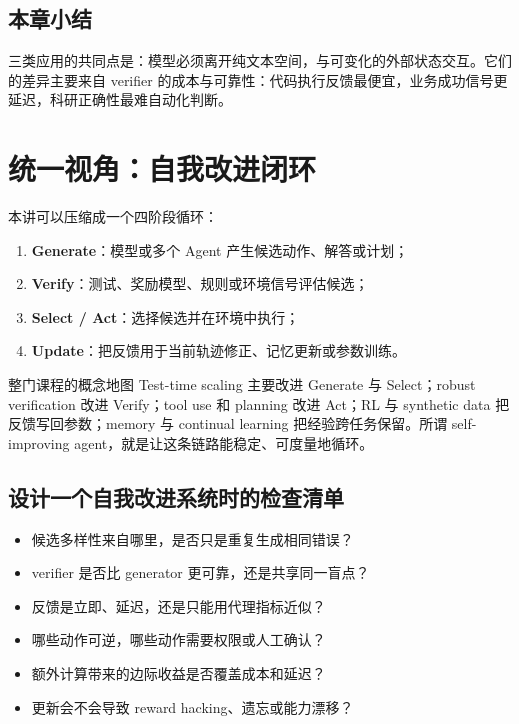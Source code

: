 \documentclass[a4paper]{article}
\begin{document}
\subsection{本章小结}

三类应用的共同点是：模型必须离开纯文本空间，与可变化的外部状态交互。它们的差异主要来自 verifier 的成本与可靠性：代码执行反馈最便宜，业务成功信号更延迟，科研正确性最难自动化判断。

\section{统一视角：自我改进闭环}

本讲可以压缩成一个四阶段循环：

\begin{enumerate}
    \item \textbf{Generate}：模型或多个 Agent 产生候选动作、解答或计划；
    \item \textbf{Verify}：测试、奖励模型、规则或环境信号评估候选；
    \item \textbf{Select / Act}：选择候选并在环境中执行；
    \item \textbf{Update}：把反馈用于当前轨迹修正、记忆更新或参数训练。
\end{enumerate}

\begin{importantbox}{整门课程的概念地图}
Test-time scaling 主要改进 Generate 与 Select；robust verification 改进 Verify；tool use 和 planning 改进 Act；RL 与 synthetic data 把反馈写回参数；memory 与 continual learning 把经验跨任务保留。所谓 self-improving agent，就是让这条链路能稳定、可度量地循环。
\end{importantbox}

\subsection{设计一个自我改进系统时的检查清单}

\begin{itemize}
    \item 候选多样性来自哪里，是否只是重复生成相同错误？
    \item verifier 是否比 generator 更可靠，还是共享同一盲点？
    \item 反馈是立即、延迟，还是只能用代理指标近似？
    \item 哪些动作可逆，哪些动作需要权限或人工确认？
    \item 额外计算带来的边际收益是否覆盖成本和延迟？
    \item 更新会不会导致 reward hacking、遗忘或能力漂移？
\end{itemize}
\end{document}
